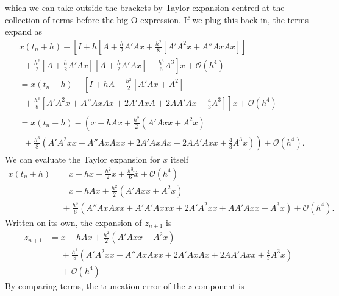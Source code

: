 which we can take outside the brackets by Taylor expansion centred at the collection of terms before the big-O expression.
If we plug this back in, the terms expand as
\begin{align*}
    &x(t_n + h) - \left[ I + h \left[ A + \frac{h}{2}A' A x + \frac{h^2}{8} \left[ A' A^2 x + A'' Ax Ax \right] \right] \right. \\
    &~~ + \left. \frac{h^2}{2} \left[ A + \frac{h}{2}A'Ax \right]\left[ A + \frac{h}{2}A'Ax \right] + \frac{h^3}{6}A^3 \right] x + \mathcal{O}(h^4) \\
    &= x(t_n + h) - \left[ I + hA + \frac{h^2}{2} \left[ A' Ax + A^2 \right] \right. \\
    &~~ + \left. \frac{h^3}{8} \left[ A' A^2 x + A'' Ax Ax + 2A'AxA + 2AA'Ax + \frac{4}{3}A^3 \right] \right]x + \mathcal{O}(h^4) \\
    &= x(t_n + h) - \left( x + hAx + \frac{h^2}{2} \left( A' Axx + A^2x \right) \right. \\
    &~~ + \left. \frac{h^3}{8} \left( A' A^2 xx + A'' Ax Ax x + 2A'AxAx + 2AA'Axx + \frac{4}{3}A^3x \right) \right) + \mathcal{O}(h^4).
\end{align*}
We can evaluate the Taylor expansion for $x$ itself
\begin{equation}
    \begin{aligned}
        x(t_n + h) &= x + h \dot{x} + \frac{h^2}{2}\ddot{x} + \frac{h^3}{6}\dddot{x} + \mathcal{O}(h^4) \\
        &= x + hAx + \frac{h^2}{2}\left( A'Axx + A^2x \right) \\
        &~~ + \frac{h^3}{6} \left( A''AxAxx + A'A'A xxx + 2A'A^2 xx + A A' A xx + A^3 x \right) + \mathcal{O}(h^4).
    \end{aligned}
    \label{eqn:thirdorderexpansion}
\end{equation}
Written on its own, the expansion of $z_{n+1}$ is
\begin{equation}
    \begin{aligned}
        z_{n+1} &= x + h Ax + \frac{h^2}{2} \left( A' A xx + A^2 x \right) \\
        &~~~~~~ + \frac{h^3}{8} \left(
            A' A^2 xx + A'' Ax Ax x + 2 A' Ax Ax + 2 A A' A xx + \frac{4}{3}A^3 x
            \right) \\
        &~~~~~~ + \mathcal{O}(h^4)
    \end{aligned}
    \label{eqn:strangzpanda}
\end{equation}
By comparing terms, the truncation error of the $z$ component is
